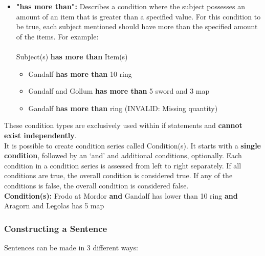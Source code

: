 \documentclass[12pt]{article}
\begin{document}
\begin{itemize}
{\begin{itemize}
    \end{itemize}
}

\item {\textbf{"has more than":} Describes a condition where the subject possesses an amount of an item that is greater than a specified value. For this condition to be true, each subject mentioned should have more than the specified amount of the items. For example: \\\\
Subject(s) \textbf{has more than} Item(s)
\begin{itemize}
        \item Gandalf \textbf{has more than} 10 ring
        \item Gandalf and Gollum \textbf{has more than} 5 sword and 3 map
        \item Gandalf \textbf{has more than} ring (INVALID: Missing quantity)

    \end{itemize}
}
\end{itemize}

\noindent These condition types are exclusively used within if statements and \textbf{cannot exist independently}.\\

\noindent It is possible to create condition series called Condition(s). It starts with a \textbf{single condition}, followed by an `and' and additional conditions, optionally. Each condition in a condition series is assessed from left to right separately. If all conditions are true, the overall condition is considered true. If any of the conditions is false, the overall condition is considered false.\\

\noindent \textbf{Condition(s):} Frodo at Mordor \textbf{and} Gandalf has lower than 10 ring \textbf{and} Aragorn and Legolas has 5 map

\subsubsection{Constructing a Sentence}
Sentences can be made in 3 different ways:
\end{document}
